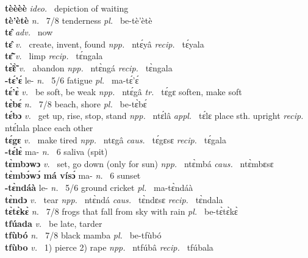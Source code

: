 {\bfseries tèèèè}  {\itshape ideo.~} depiction of waiting    \\ 
{\bfseries tè'ètè}  {\itshape n.~} 7/8 tenderness {\itshape pl.~} be-tè'ètè    \\ 
{\bfseries tɛ̂}  {\itshape adv.~} now    \\ 
{\bfseries tɛ̂}  {\itshape v.~} create, invent, found   {\itshape npp.~} ntɛ́yâ {\itshape recip.~} tɛ́yala  \\ 
{\bfseries tɛ̃̂}  {\itshape v.~} limp   {\itshape recip.~} tɛ́ngala \\ 
{\bfseries tɛ̃̀ɛ̃̀}  {\itshape v.~} abandon   {\itshape npp.~} ntɛ̀ngá {\itshape recip.~} tɛ̀ngala  \\ 
{\bfseries -tɛ́'ɛ́} le- {\itshape n.~} 5/6 fatigue {\itshape pl.~} ma-tɛ́'ɛ́    \\ 
{\bfseries tɛ́'ɛ̀}  {\itshape v.~} be soft, be weak   {\itshape npp.~} ntɛ́gâ {\itshape tr.~} tɛ́gɛ soften, make soft \\ 
{\bfseries tɛ̀bɛ́}  {\itshape n.~} 7/8 beach, shore {\itshape pl.~} be-tɛ̀bɛ́   \\ 
{\bfseries tɛ́bɔ}  {\itshape v.~} get up, rise, stop, stand   {\itshape npp.~} ntɛ́lâ {\itshape appl.~} tɛ́lɛ place sth. upright {\itshape recip.~} ntɛ́lala place each other  \\ 
{\bfseries tɛ́gɛ}  {\itshape v.~} make tired   {\itshape npp.~} ntɛgâ {\itshape caus.~} tɛ́gɛsɛ {\itshape recip.~} tɛ́gala  \\ 
{\bfseries -tɛ́lɛ̀} ma- {\itshape n.~} 6 saliva (spit)    \\ 
{\bfseries tɛ̀mbɔwɔ}  {\itshape v.~} set, go down (only for sun)   {\itshape npp.~} ntɛ̀mbá {\itshape caus.~} ntɛ̀mbɛsɛ  \\ 
{\bfseries tɛ̀mbɔ́wɔ́ má vísɔ́} ma- {\itshape n.~} 6 sunset    \\ 
{\bfseries -tɛ̀ndáà} le- {\itshape n.~} 5/6 ground cricket {\itshape pl.~} ma-tɛ̀ndáà    \\ 
{\bfseries tɛ̀ndɔ}  {\itshape v.~} tear   {\itshape npp.~} ntɛ̀ndá {\itshape caus.~} tɛ̀ndɛsɛ  {\itshape recip.~} tɛ̀ndala  \\ 
{\bfseries tɛ̀tɛ̀kɛ̀}  {\itshape n.~} 7/8 frogs that fall from sky with rain {\itshape pl.~} be-tɛ̀tɛ̀kɛ̀    \\ 
{\bfseries tfúada}  {\itshape v.~} be late, tarder    \\ 
{\bfseries tfùbó}  {\itshape n.~} 7/8 black mamba {\itshape pl.~} be-tfùbó    \\ 
{\bfseries tfùbo}  {\itshape v.~} 1) pierce 2) rape   {\itshape npp.~} ntfúbâ {\itshape recip.~} tfúbala  \\ 
